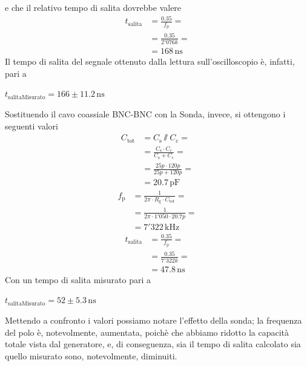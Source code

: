 \documentclass{article}
\begin{document}
				e che il relativo tempo di salita dovrebbe valere
				\begin{equation*}
					\begin{split}
						t_{\mathrm{salita}} &= \frac{0.35}{f_{\mathrm{p}}} = \\
											&= \frac{0.35}{2'076k} = \\
											&= 168 \, \mathrm{ns}
					\end{split}
				\end{equation*}
				Il tempo di salita del segnale ottenuto dalla lettura sull'oscilloscopio è, infatti, pari a
				\newline
				\begin{center}
					$ t_{\mathrm{salitaMisurato}} = 166 \pm 11.2 \, \mathrm{ns} $
				\end{center}
				\newline
				Sostituendo il cavo coassiale BNC-BNC con la Sonda, invece, si ottengono i seguenti valori
				\begin{equation*}
					\begin{split}
						C_{\mathrm{tot}} &= C_{\mathrm{s}} \sslash C_{\mathrm{c}} = \\
										 &= \frac{C_{\mathrm{s}} \cdot C_{\mathrm{c}}}{C_{\mathrm{s}} + C_{\mathrm{c}}} =\\
										 &= \frac{25p \cdot 120p}{25p + 120p} =\\
										 &= 20.7 \, \mathrm{pF}
					\end{split}
				\end{equation*}
				\begin{equation*}
					\begin{split}
						f_{\mathrm{p}} &= \frac{1}{2 \pi \cdot R_{\mathrm{g}} \cdot C_{\mathrm{tot}}} = \\
									   &= \frac{1}{2 \pi \cdot 1'050 \cdot 20.7p} = \\
									   &= 7'322 \, \mathrm{kHz}
					\end{split}
				\end{equation*}
				\begin{equation*}
					\begin{split}
						t_{\mathrm{salita}} &= \frac{0.35}{f_{\mathrm{p}}} = \\
											&= \frac{0.35}{7'322k} = \\
											&= 47.8 \, \mathrm{ns}
					\end{split}
				\end{equation*}
				Con un tempo di salita misurato pari a
				\newline
				\begin{center}
					$ t_{\mathrm{salitaMisurato}} = 52 \pm 5.3 \, \mathrm{ns} $
				\end{center}
				Mettendo a confronto i valori possiamo notare l'effetto della sonda; la frequenza del polo è, notevolmente, aumentata, poichè che abbiamo ridotto la capacità totale vista dal generatore, e, di conseguenza, sia il tempo di salita calcolato sia quello misurato sono, notevolmente, diminuiti.
\end{document}
